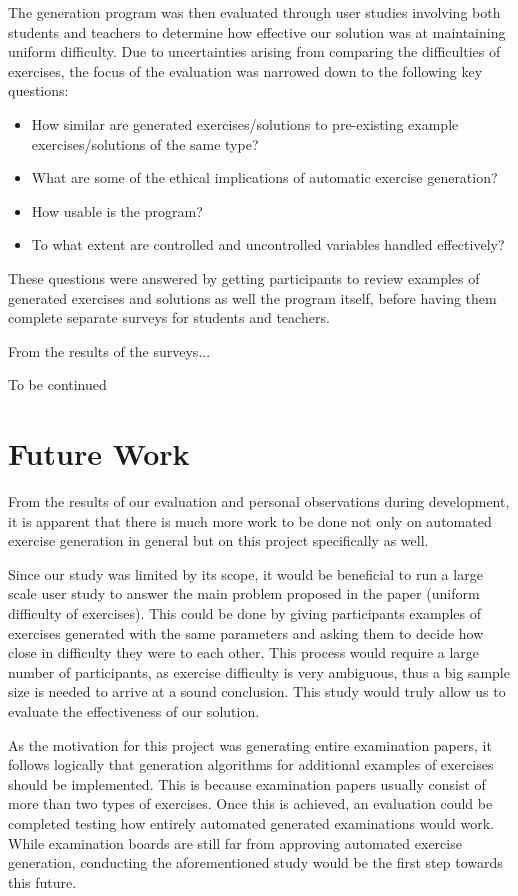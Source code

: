 \documentclass{l4proj}
\begin{document}
The generation program was then evaluated through user studies involving both students and teachers to determine how effective our solution was at maintaining uniform difficulty. Due to uncertainties arising from comparing the difficulties of exercises, the focus of the evaluation was narrowed down to the following key questions:

\begin{itemize}
	\item
	How similar are generated exercises/solutions to pre-existing example exercises/solutions of the same type?
	\item
	What are some of the ethical implications of automatic exercise generation?
	\item
	How usable is the program?
	\item
	To what extent are controlled and uncontrolled variables handled effectively?
\end{itemize}

These questions were answered by getting participants to review examples of generated exercises and solutions as well the program itself, before having them complete separate surveys for students and teachers. 

From the results of the surveys...

To be continued

\section{Future Work}

From the results of our evaluation and personal observations during development, it is apparent that there is much more work to be done not only on automated exercise generation in general but on this project specifically as well.

Since our study was limited by its scope, it would be beneficial to run a large scale user study to answer the main problem proposed in the paper (uniform difficulty of exercises). This could be done by giving participants examples of exercises generated with the same parameters and asking them to decide how close in difficulty they were to each other. This process would require a large number of participants, as exercise difficulty is very ambiguous, thus a big sample size is needed to arrive at a sound conclusion. This study would truly allow us to evaluate the effectiveness of our solution.

As the motivation for this project was generating entire examination papers, it follows logically that generation algorithms for additional examples of exercises should be implemented. This is because examination papers usually consist of more than two types of exercises. Once this is achieved, an evaluation could be completed testing how entirely automated generated examinations would work. While examination boards are still far from approving automated exercise generation, conducting the aforementioned study would be the first step towards this future.
\end{document}
